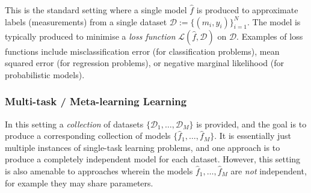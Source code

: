 This is the standard setting where a single model $\hat{f}$
is produced to approximate labels (measurements) from a single dataset
$\mathcal{D}:=\{(m_i,y_i)\}_{i=1}^N$.
The model is typically produced to minimise a \emph{loss function}
$\mathcal{L}(\hat f, \mathcal D)$ on $\mathcal D$.
Examples of loss functions include misclassification error (for classification problems),
mean squared error (for regression problems),
or negative marginal likelihood (for probabilistic models).

\subsubsection{Multi-task / Meta-learning Learning}

In this setting a \emph{collection} of datasets $\{\mathcal D_1, \ldots, \mathcal D_M \}$
is provided, and the goal is to produce a corresponding collection
of models $\{\hat f_1, \ldots, \hat f_M\}$.
It is essentially just multiple instances of single-task learning problems,
and one approach is to produce a completely independent model for each dataset.
However, this setting is also amenable to approaches wherein
the models $\hat f_1, \ldots, \hat f_M$ are \emph{not} independent,
for example they may share parameters.
